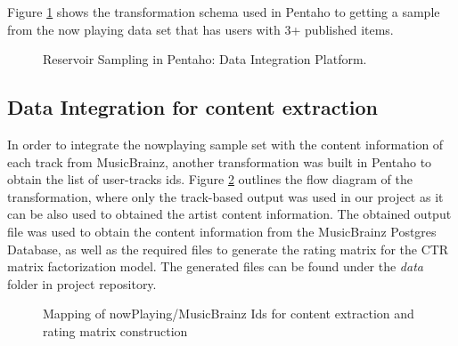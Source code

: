 \documentclass{article} %
\begin{document}
Figure \ref{fig:samplingP} shows the transformation schema used in Pentaho to getting a sample from the now playing data set that has users with 3+ published items.

\begin{figure}[ht]
\centering
{}
\caption{Reservoir Sampling in Pentaho: Data Integration Platform.}
\label{fig:samplingP}
\end{figure}

\subsection{Data Integration for content extraction}

In order to integrate the nowplaying sample set with the content information of each track from MusicBrainz, another transformation was built in Pentaho to obtain the list of user-tracks ids. Figure \ref{fig:forRatrings} outlines the flow diagram of the transformation, where only the track-based output was used in our project as it can be also used to obtained the artist content information. The obtained output file was used to obtain the content information from the MusicBrainz Postgres Database, as well as the required files to generate the rating matrix for the CTR matrix factorization model. The generated files can be found under the \textit{data} folder in project repository.

\begin{figure}[ht]
\centering
{}
\caption{Mapping of nowPlaying/MusicBrainz Ids for content extraction and rating matrix construction}
\label{fig:forRatrings}
\end{figure}
\end{document}
